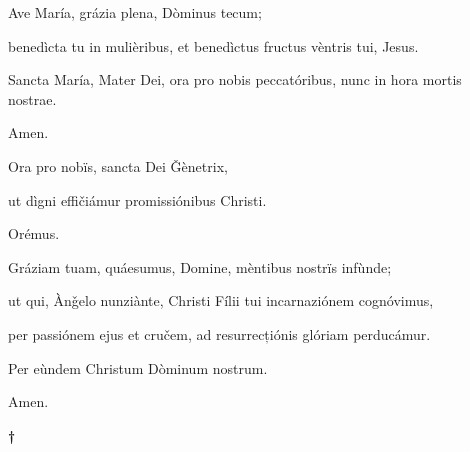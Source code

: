 \documentclass[twoside,10pt]{article}
\begin{document}
{  \noindent Ave María, grázia plena, Dòminus tecum;
  
  benedìcta tu in mulièribus, et benedìctus fructus vèntris tui, Jesus.

  Sancta María, Mater Dei, ora pro nobis peccatóribus, nunc in hora mortis nostrae.

  Amen.

  \bigskip

   Ora pro nobïs, sancta Dei Ǧènetrix,

  \smallskip

   ut dìgni effičiámur promissiónibus Christi.

  \bigskip

   Orémus.

  \bigskip

  \noindent Gráziam tuam, quáesumus, Domine, mèntibus nostrïs infùnde;

  ut qui, Ànǧelo nunziànte, Christi Fílii tui incarnaziónem cognóvimus,

  per passiónem ejus et cručem, ad resurrecțiónis glóriam perducámur.

  Per eùndem Christum Dòminum nostrum.

  \bigskip

   Amen.

  \bigskip
  \medskip

  \begin{center}
  {\bfseries\large †}
  \end{center}

}
\end{document}
